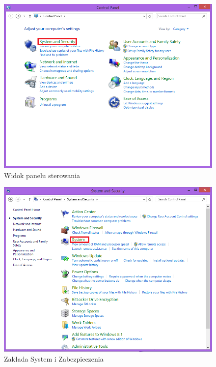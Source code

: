 \begin{figure}[h]
\centering
\includegraphics[width=14cm]{Zdjecia/5/anaconda1}
\caption{Widok panelu sterowania}
\label{fig:anaconda1}
\end{figure}

\begin{figure}[h]
\centering
\includegraphics[width=14cm]{Zdjecia/5/anaconda2}
\caption{Zakłada System i Zabezpieczenia}
\label{fig:anaconda2}
\end{figure}

